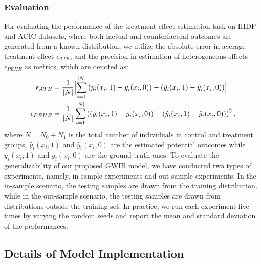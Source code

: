 \documentclass{article}
\begin{document}
\subsubsection{Evaluation}
For evaluating the performance of the treatment effect estimation task on IHDP and ACIC datasets, where both factual and counterfactual outcomes are generated from a known distribution, we utilize the absolute error in average treatment effect $\epsilon_{ATE}$, and the precision in estimation of heterogeneous effects $\epsilon_{PEHE}$ as metrics, which are denoted as:
\begin{eqnarray}
\begin{aligned}
	\epsilon_{ATE} &=  \frac{1}{|N|} \Bigl|\sum_{i=1}^{|N|} \left(y_i(x_i, 1)-y_i(x_i, 0)\right) - \left(\hat{y}_i(x_i, 1)-\hat{y}_i(x_i, 0)\right)\Bigr|\\
	\epsilon_{PEHE} &= \frac{1}{|N|} \sum_{i=1}^{|N|} \left(\left(y_i(x_i, 1)-y_i(x_i, 0)\right) - \left(\hat{y}_i(x_i, 1)-\hat{y}_i(x_i, 0)\right)\right)^2,
\end{aligned}
\end{eqnarray}
where $N = N_0 + N_1$ is the total number of individuals in control and treatment groups, $\hat{y}_i(x_i, 1)$ and $\hat{y}_i(x_i, 0)$ are the estimated potential outcomes while $y_i(x_i, 1)$ and $y_i(x_i, 0)$ are the ground-truth ones.
To evaluate the generalizability of our proposed GWIB model, we have conducted two types of experiments, namely, in-sample experiments and out-sample experiments.
In the in-sample scenario, the testing samples are drawn from the training distribution, while in the out-sample scenario, the testing samples are drawn from distributions outside the training set. 
In practice, we run each experiment five times by varying the random seeds and report the mean and standard deviation of the performances.

\subsection{Details of Model Implementation}
\end{document}
